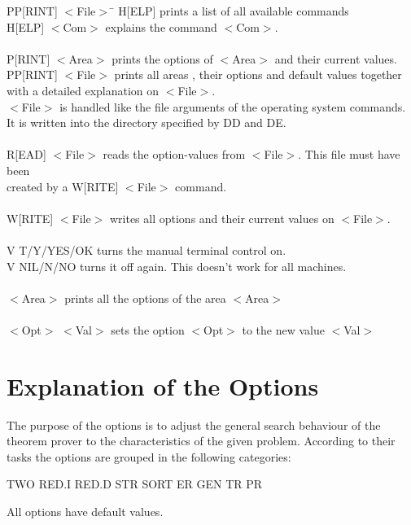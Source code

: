 \begin{tabbing}
PP[RINT]  $<$File$>$ \=\kill
H[ELP]\> prints a list of all available commands \\
H[ELP]  $<$Com$>$ 	\> explains the command $<$Com$>$.\\
\\
P[RINT] $<$Area$>$ 	\> prints the options of $<$Area$>$ and their current values.
\\
PP[RINT]  $<$File$>$\> prints all areas , their options and default values 
together\\
\> with a detailed explanation on $<$File$>$.\\ 
\>$<$File$>$ is handled like the file arguments of the operating system commands.\\
\>It is written into the directory specified by DD and DE.\\
\\
R[EAD] $<$File$>$   \> 	 reads the option-values from $<$File$>$. This file 
must have been \\
\> created  by a W[RITE] $<$File$>$ command.\\
\\
W[RITE] $<$File$>$  \> writes all options and their current values on $<$File$>$.\\
\\
V  T/Y/YES/OK   \> 	 turns the manual terminal control on. \\
V  NIL/N/NO     \>	 turns it off again. This doesn't work for all
machines.\\
\\
$<$Area$>$       \>       prints all the options of the area $<$Area$>$\\
\\
$<$Opt$>$ $<$Val$>$   \>    sets the option $<$Opt$>$ to the new value $<$Val$>$
\end{tabbing}

\section{Explanation of the Options}

The purpose of the options is to adjust the general search behaviour of the 
theorem prover to the characteristics of the given problem. According  to 
their tasks the options are grouped in the following categories: 

 \quad     TWO   RED.I   RED.D   STR   SORT   ER  GEN   TR   PR

All options have default values. 


